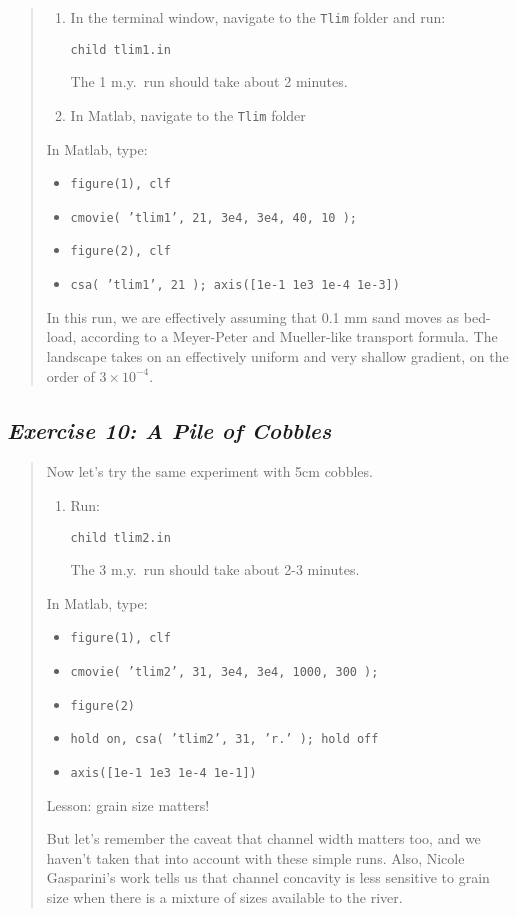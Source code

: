 \documentclass[12pt,reqno]{amsart}
\begin{document}
\begin{quote}
\small
{\sf
\begin{enumerate}
\item
In the terminal window, navigate to the {\tt Tlim} folder and run:

{\tt child tlim1.in}

The 1 m.y.\ run should take about 2 minutes.
\item
In Matlab, navigate to the {\tt Tlim} folder
\end{enumerate}

\noindent
In Matlab, type:
\begin{itemize}
\setcounter{enumi}{2}
\item
{\tt figure(1), clf}
\item
{\tt cmovie( 'tlim1', 21, 3e4, 3e4, 40, 10 );}
\item
{\tt figure(2), clf}
\item
{\tt csa( 'tlim1', 21 ); axis([1e-1 1e3 1e-4 1e-3])}
\end{itemize}

\noindent
In this run, we are effectively assuming that 0.1 mm sand moves as bed-load, according to a Meyer-Peter and Mueller-like transport formula. The landscape takes on an effectively uniform and very shallow gradient, on the order of $3\times 10^{-4}$.
}
\end{quote}

\subsection*{\em Exercise 10: A Pile of Cobbles}

\begin{quote}
\small
{\sf
Now let's try the same experiment with 5cm cobbles.

\begin{enumerate}
\item
Run:

{\tt child tlim2.in}

The 3 m.y.\ run should take about 2-3 minutes.
\end{enumerate}

\noindent
In Matlab, type:
\begin{itemize}
\setcounter{enumi}{1}
\item
{\tt figure(1), clf}
\item
{\tt cmovie( 'tlim2', 31, 3e4, 3e4, 1000, 300 );}
\item
{\tt figure(2)}
\item
{\tt hold on, csa( 'tlim2', 31, 'r.' ); hold off}
\item
{\tt axis([1e-1 1e3 1e-4 1e-1])}
\end{itemize}

Lesson: grain size matters! 

But let's remember the caveat that channel width matters too, and we
haven't taken that into account with these simple runs. Also, Nicole
Gasparini's work \citep{gasparini1999downstream,gasparini2004network}
tells us that channel concavity is less sensitive to grain size when
there is a mixture of sizes available to the river.
}
\end{quote}
\end{document}
